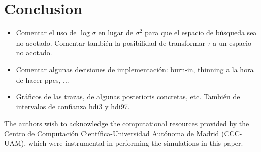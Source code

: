 \documentclass[ba]{imsart}
\numberwithin{equation}{section}
\theoremstyle{plain}
\newenvironment{comment}[1][comment-red]
{
\noindent \color{#1}
}
{
\color{black}
}
\begin{document}
\section{Conclusion}\label{sec:conclusion}

\begin{supplement}

\begin{comment}
  \begin{itemize}
  \item Comentar el uso de \(\log\sigma\) en lugar de \(\sigma^2\) para que el espacio de búsqueda sea no acotado. Comentar también la posibilidad de transformar \(\tau\) a un espacio no acotado.
  \item Comentar algunas decisiones de implementación: burn-in, thinning a la hora de hacer ppcs, ...
  \item Gráficos de las trazas, de algunas posterioris concretas, etc. También de intervalos de confianza hdi3 y hdi97.
\end{itemize}
\end{comment}

\end{supplement}




\begin{acks}[Acknowledgments]
The authors wish to acknowledge the computational resources provided by the Centro de Computación Científica-Universidad Autónoma de Madrid (CCC-UAM), which were instrumental in performing the simulations in this paper.
\end{acks}
\end{document}
